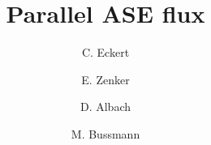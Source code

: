 \documentclass[3p,twocolumn]{elsarticle}
\begin{document}
\title{Parallel ASE flux}

\author[hzdr]{C. Eckert}

\author[hzdr]{E. Zenker}

\author[hzdr]{D. Albach}

\author[hzdr]{M. Bussmann}

\address[hzdr]{
  Institute of Radiation Physics, 
  Helmholtz-Zentrum Dresden-Rossendorf e. V.,
  Bautzner Landstra\ss e 400,
  01328 Dresden,  
  Germany
}




\maketitle






		




\end{document}

